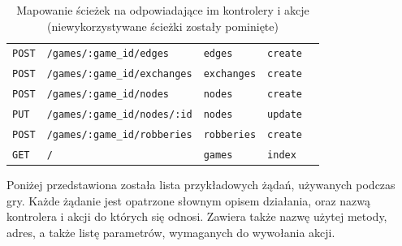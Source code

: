 \documentclass[a4paper,12pt]{article}
\begin{document}
\begin{table}[ht]
\begin{tabular}{|l|l|l|l|l|}
    \texttt{POST} & \texttt{/games/:game\_id/edges} & \texttt{edges} & \texttt{create} \\
    \texttt{POST} & \texttt{/games/:game\_id/exchanges} & \texttt{exchanges} & \texttt{create} \\
    \texttt{POST} & \texttt{/games/:game\_id/nodes} & \texttt{nodes} & \texttt{create} \\
    \texttt{PUT} & \texttt{/games/:game\_id/nodes/:id} & \texttt{nodes} & \texttt{update} \\
    \texttt{POST} & \texttt{/games/:game\_id/robberies} & \texttt{robberies} & \texttt{create} \\
    \texttt{GET} & \texttt{/} & \texttt{games} & \texttt{index} \\
    \hline
  \end{tabular}
  \caption{Mapowanie ścieżek na odpowiadające im kontrolery i
    akcje (niewykorzystywane ścieżki zostały pominięte)}
  \label{table:routes}
\end{table}

Poniżej przedstawiona została lista przykładowych żądań, używanych
podczas gry. Każde żądanie jest opatrzone słownym opisem działania,
oraz nazwą kontrolera i akcji do których się odnosi. Zawiera także
nazwę użytej metody, adres, a także listę parametrów, wymaganych do
wywołania akcji.
\end{document}
